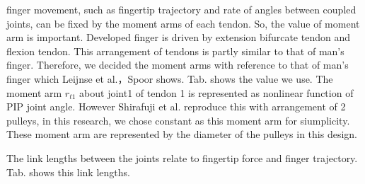 \documentclass{llncs}
\begin{document}
finger movement, such as fingertip trajectory and rate of angles between coupled joints, 
can be fixed by the moment arms of each tendon. 
So, the value of moment arm is important.
Developed finger is driven by extension bifurcate tendon and flexion tendon.
This arrangement of tendons is partly similar to that of man's finger.
Therefore, we decided the moment arms with reference to that of man's finger which Leijnse et al.\cite{Leijnse1995}，Spoor\cite{Spoor1983} shows.
Tab. shows the value we use.
The moment arm $r_{t1}$ about joint1 of tendon 1 is represented as nonlinear function of PIP joint angle.
However Shirafuji et al. reproduce this with arrangement of 2 pulleys, 
in this research, we chose constant as this moment arm for siumplicity.
These moment arm are represented by the diameter of the pulleys in this design.

The link lengths between the joints relate to fingertip force and finger trajectory.
Tab. shows this link lengths.
		
\end{document}

